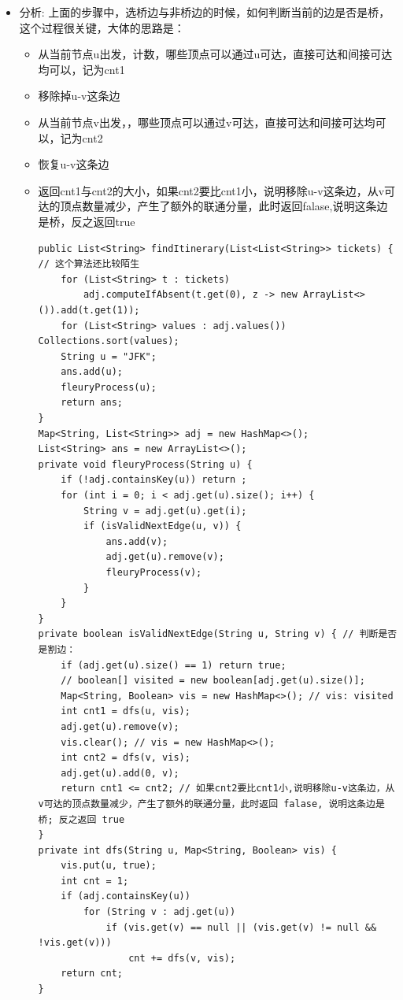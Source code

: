 \documentclass[9pt, b5paaper]{book}
\begin{document}
\begin{enumerate}
\begin{itemize}
\item 分析: 上面的步骤中，选桥边与非桥边的时候，如何判断当前的边是否是桥，这个过程很关键，大体的思路是：
\begin{itemize}
\item 从当前节点u出发，计数，哪些顶点可以通过u可达，直接可达和间接可达均可以，记为cnt1
\item 移除掉u-v这条边
\item 从当前节点v出发，，哪些顶点可以通过v可达，直接可达和间接可达均可以，记为cnt2
\item 恢复u-v这条边
\item 返回cnt1与cnt2的大小，如果cnt2要比cnt1小，说明移除u-v这条边，从v可达的顶点数量减少，产生了额外的联通分量，此时返回falase,说明这条边是桥，反之返回true

\begin{verbatim}
public List<String> findItinerary(List<List<String>> tickets) { // 这个算法还比较陌生
    for (List<String> t : tickets) 
        adj.computeIfAbsent(t.get(0), z -> new ArrayList<>()).add(t.get(1));
    for (List<String> values : adj.values()) Collections.sort(values);
    String u = "JFK";
    ans.add(u);
    fleuryProcess(u);
    return ans;
}
Map<String, List<String>> adj = new HashMap<>();
List<String> ans = new ArrayList<>();
private void fleuryProcess(String u) {
    if (!adj.containsKey(u)) return ;
    for (int i = 0; i < adj.get(u).size(); i++) {
        String v = adj.get(u).get(i);
        if (isValidNextEdge(u, v)) {
            ans.add(v);
            adj.get(u).remove(v);
            fleuryProcess(v);
        }
    }
}
private boolean isValidNextEdge(String u, String v) { // 判断是否是割边：
    if (adj.get(u).size() == 1) return true;
    // boolean[] visited = new boolean[adj.get(u).size()];
    Map<String, Boolean> vis = new HashMap<>(); // vis: visited
    int cnt1 = dfs(u, vis);
    adj.get(u).remove(v);
    vis.clear(); // vis = new HashMap<>();
    int cnt2 = dfs(v, vis);
    adj.get(u).add(0, v);
    return cnt1 <= cnt2; // 如果cnt2要比cnt1小,说明移除u-v这条边，从v可达的顶点数量减少，产生了额外的联通分量，此时返回 falase, 说明这条边是桥; 反之返回 true 
}
private int dfs(String u, Map<String, Boolean> vis) {
    vis.put(u, true);
    int cnt = 1;
    if (adj.containsKey(u)) 
        for (String v : adj.get(u)) 
            if (vis.get(v) == null || (vis.get(v) != null && !vis.get(v))) 
                cnt += dfs(v, vis);
    return cnt;
}
\end{verbatim}
\end{itemize}
\end{itemize}
\end{enumerate}
\end{document}
